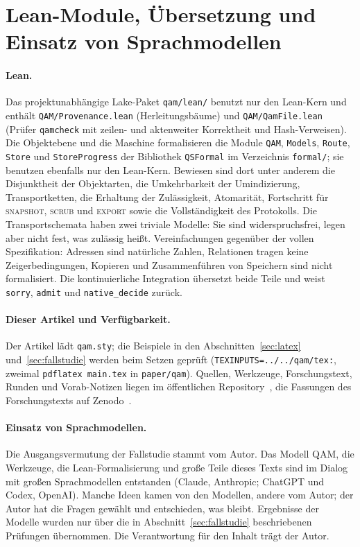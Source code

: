 \section{Lean-Module, Übersetzung und Einsatz von Sprachmodellen}\label{app:lean}

\paragraph{Lean.} Das projektunabhängige Lake-Paket \texttt{qam/lean/} benutzt nur den Lean-Kern und enthält \texttt{QAM/Provenance.lean}
(Herleitungsbäume) und \texttt{QAM/QamFile.lean} (Prüfer \texttt{qamcheck} mit zeilen- und aktenweiter Korrektheit und Hash-Verweisen). Die
Objektebene und die Maschine formalisieren die Module \texttt{QAM}, \texttt{Models}, \texttt{Route}, \texttt{Store} und
\texttt{StoreProgress} der Bibliothek \texttt{QSFormal} im Verzeichnis \texttt{formal/}; sie benutzen ebenfalls nur den Lean-Kern. Bewiesen
sind dort unter anderem die Disjunktheit der Objektarten, die Umkehrbarkeit der Umindizierung, Transportketten, die Erhaltung der
Zulässigkeit, Atomarität, Fortschritt für \textsc{snapshot}, \textsc{scrub} und \textsc{export} sowie die Vollständigkeit des Protokolls.
Die Transportschemata haben zwei triviale Modelle: Sie sind widerspruchsfrei, legen aber nicht fest, was zulässig heißt. Vereinfachungen
gegenüber der vollen Spezifikation: Adressen sind natürliche Zahlen, Relationen tragen keine Zeigerbedingungen, Kopieren und
Zusammenführen von Speichern sind nicht formalisiert. Die kontinuierliche Integration übersetzt beide Teile und weist \texttt{sorry},
\texttt{admit} und \texttt{native\_decide} zurück.

\paragraph{Dieser Artikel und Verfügbarkeit.} Der Artikel lädt \texttt{qam.sty}; die Beispiele in den Abschnitten~\ref{sec:latex}
und~\ref{sec:fallstudie} werden beim Setzen geprüft (\texttt{TEXINPUTS=../../qam/tex:}, zweimal \texttt{pdflatex main.tex} in
\texttt{paper/qam}). Quellen, Werkzeuge, Forschungstext, Runden und Vorab-Notizen liegen im öffentlichen Repository~\cite{repo}, die
Fassungen des Forschungstexts auf Zenodo~\cite{companion}.

\paragraph{Einsatz von Sprachmodellen.} Die Ausgangsvermutung der Fallstudie stammt vom Autor. Das Modell QAM, die Werkzeuge, die
Lean-Formalisierung und große Teile dieses Texts sind im Dialog mit großen Sprachmodellen entstanden (Claude, Anthropic; ChatGPT und Codex,
OpenAI). Manche Ideen kamen von den Modellen, andere vom Autor; der Autor hat die Fragen gewählt und entschieden, was bleibt. Ergebnisse der
Modelle wurden nur über die in Abschnitt~\ref{sec:fallstudie} beschriebenen Prüfungen übernommen. Die Verantwortung für den Inhalt trägt
der Autor.
